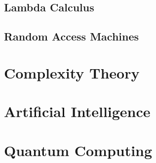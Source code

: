\subsection{Lambda Calculus}

\subsection{Random Access Machines}



\section{Complexity Theory}




\section{Artificial Intelligence}






\section{Quantum Computing}




